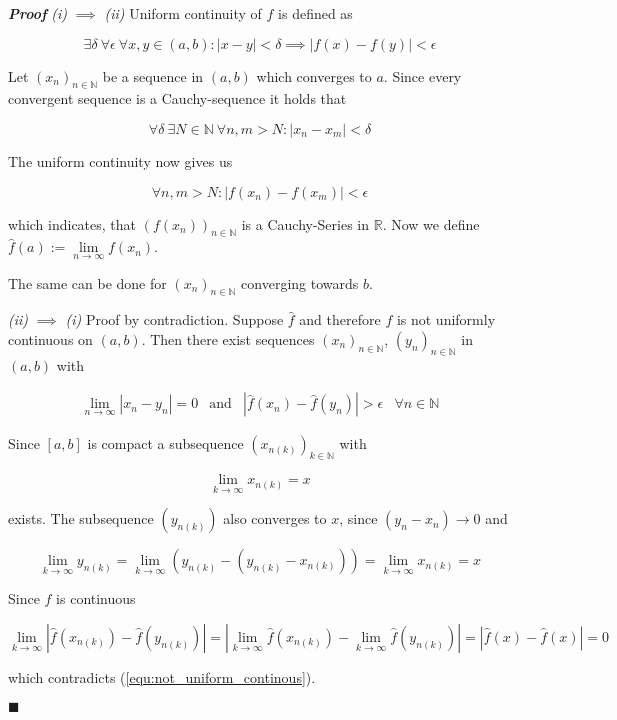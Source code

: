 \documentclass[]{article}
\newenvironment{proof}{\textit{\textbf{Proof}}}{\hfill$\blacksquare$}
\begin{document}
\begin{proof}
	\textit{(i)} $\implies$ \textit{(ii)}	
	Uniform continuity of $f$ is defined as
	
	\[\exists \delta\ \forall \epsilon\ \forall x, y \in (a, b) : |x - y| < \delta \implies |f(x) - f(y)| < \epsilon \]
	
	Let $(x_n)_{n \in \mathbb{N}}$ be a sequence in $(a, b)$ which converges to $a$. Since every convergent sequence is a Cauchy-sequence it holds that
	
	\[\forall \delta\ \exists N \in \mathbb{N}\: \forall n, m > N : |x_n - x_m| < \delta\]
	
	The uniform continuity now gives us
	
	\[\forall n, m > N : |f(x_n) - f(x_m)| < \epsilon\]
	
	which indicates, that $(f(x_n))_{n \in \mathbb{N}}$ is a Cauchy-Series in $\mathbb{R}$. Now we define $\hat{f}(a):=\lim\limits_{n \to \infty}f(x_n)$.
	
	The same can be done for $(x_n)_{n \in \mathbb{N}}$ converging towards $b$.
	\newline
	
	\noindent
	\textit{(ii)} $\implies$ \textit{(i)} Proof by contradiction. Suppose $\hat{f}$ and therefore $f$ is not uniformly continuous on $(a, b)$. Then there exist sequences $(x_n)_{n \in \mathbb{N}}$, $(y_n)_{n \in \mathbb{N}}$ in $(a, b)$ with
	
	\begin{equation}
		\label{equ:not_uniform_continous}
		\begin{array}{cccc}
			\lim\limits_{n \to \infty} |x_n - y_n| = 0 &
			\textrm{and} &
			|\hat{f}(x_n)-\hat{f}(y_n)|>\epsilon &
			\forall n \in \mathbb{N}
		\end{array}
	\end{equation}
	
	Since $[a, b]$ is compact a subsequence $(x_{n(k)})_{k \in \mathbb{N}}$ with
	
	\[\lim\limits_{k \to \infty}x_{n(k)} = x\]
	
	exists. The subsequence $(y_{n(k)})$ also converges to $x$, since $(y_n - x_n) \to 0$ and
	
	\[\lim\limits_{k \to \infty}y_{n(k)} = \lim\limits_{k \to \infty}(y_{n(k)} - (y_{n(k)} - x_{n(k)})) = \lim\limits_{k \to \infty}x_{n(k)} = x\]
	
	Since $\hat{f}$ is continuous
	
	\[\lim\limits_{k \to \infty}|\hat{f}(x_{n(k)}) - \hat{f}(y_{n(k)})| = |\lim\limits_{k \to \infty} \hat{f}(x_{n(k)}) - \lim\limits_{k \to \infty} \hat{f}(y_{n(k)})| = |\hat{f}(x) - \hat{f}(x)| = 0\]
	
	which contradicts (\ref{equ:not_uniform_continous}).
	
\end{proof}
\end{document}
